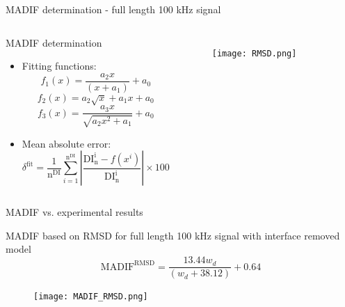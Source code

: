\documentclass[10pt,aspectratio=169]{beamer} %
\begin{document}
\begin{frame}[label=frame21]{MADIF determination - full length 100 kHz signal}
		
		\begin{columns}[T]
			\begin{block}{MADIF determination}
				\begin{itemize}
					\item Fitting functions:\\
					\footnotesize
					\begin{equation*}
						f_1(x) = \frac{a_2x}{(x+a_1)}+a_0
						\label{eq:f1}
					\end{equation*}
					\begin{equation*}
						f_2(x) = a_2\sqrt{x}+a_1x +a_0
						\label{eq:f2}
					\end{equation*}
					\begin{equation*}
						f_3(x) = \frac{a_3x}{\sqrt{a_2x^2+a_1}}+a_0
						\label{eq:f3}
					\end{equation*}
				\end{itemize}
					\begin{itemize}
						\item Mean absolute error:\\
						\footnotesize
						\begin{equation*}
							\delta^{\mathrm{fit}} = \frac{1}{\mathrm{n^{DI}}}\sum_{i=1}^{\mathrm{n^{DI}}} \left|\frac{\mathrm{DI^i_{n}}-f(x^i)}{\mathrm{DI^i_{n}}}\right|\times100
							\label{eq:delta}
						\end{equation*}
					\end{itemize}
				\end{block}
				\begin{figure}
					\texttt{[image: RMSD.png]}
					\label{fig:RMSD_full_100}
				\end{figure}
			\end{columns}

\end{frame}

\begin{frame}[label=frame22]{MADIF vs. experimental results}
	\begin{block}{MADIF based on RMSD for full length 100 kHz signal with interface removed model}
		\footnotesize
		\begin{equation*}
			\mathrm{MADIF}^\mathrm{RMSD} = \frac{13.44w_d}{(w_d+38.12)}+0.64
			\label{eq:rmsd}
		\end{equation*}
	\end{block}
\begin{figure}
	\texttt{[image: MADIF\_RMSD.png]}
	\label{fig:MADIF_RMSD}
\end{figure}
\end{frame}
\end{document}
